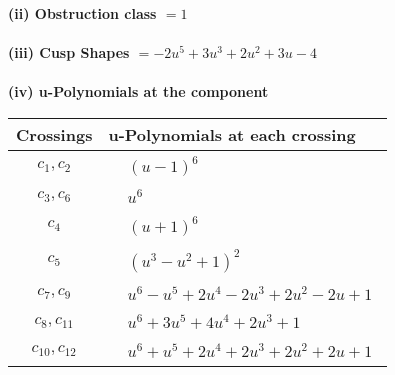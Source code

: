 \documentclass[1p]{elsarticle_modified}
\theoremstyle{definition}
\begin{document}
\flushleft \textbf{(ii) Obstruction class $= 1$}\\~\\
\flushleft \textbf{(iii) Cusp Shapes $= -2 u^5+3 u^3+2 u^2+3 u-4$}\\~\\
\newpage\renewcommand{\arraystretch}{1}
\flushleft \textbf{(iv) u-Polynomials at the component}\newline \\
\begin{tabular}{m{50pt}|m{274pt}}
Crossings & \hspace{64pt}u-Polynomials at each crossing \\
\hline $$\begin{aligned}c_{1},c_{2}\end{aligned}$$&$\begin{aligned}
&(u-1)^6
\end{aligned}$\\
\hline $$\begin{aligned}c_{3},c_{6}\end{aligned}$$&$\begin{aligned}
&u^6
\end{aligned}$\\
\hline $$\begin{aligned}c_{4}\end{aligned}$$&$\begin{aligned}
&(u+1)^6
\end{aligned}$\\
\hline $$\begin{aligned}c_{5}\end{aligned}$$&$\begin{aligned}
&(u^3- u^2+1)^2
\end{aligned}$\\
\hline $$\begin{aligned}c_{7},c_{9}\end{aligned}$$&$\begin{aligned}
&u^6- u^5+2 u^4-2 u^3+2 u^2-2 u+1
\end{aligned}$\\
\hline $$\begin{aligned}c_{8},c_{11}\end{aligned}$$&$\begin{aligned}
&u^6+3 u^5+4 u^4+2 u^3+1
\end{aligned}$\\
\hline $$\begin{aligned}c_{10},c_{12}\end{aligned}$$&$\begin{aligned}
&u^6+u^5+2 u^4+2 u^3+2 u^2+2 u+1
\end{aligned}$\\
\hline
\end{tabular}\\~\\
\end{document}
